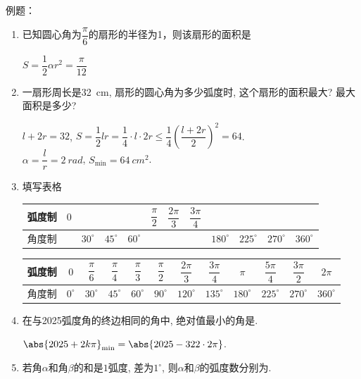 例题：
\begin{enumerate}
    \item 已知圆心角为$\dfrac{\pi}{6}$的扇形的半径为1，则该扇形的面积是
    \begin{jieda}
        $S = \dfrac{1}{2}\alpha r^2 = \dfrac{\pi}{12}$
    \end{jieda}
    \item 一扇形周长是\SI{32}{cm}, 扇形的圆心角为多少弧度时, 这个扇形的面积最大? 最大面积是多少? 
    \begin{jieda}
    $l+2r=32$, $S=\dfrac{1}{2}lr=\dfrac{1}{4}\cdot l\cdot2r\leq\dfrac{1}{4}\left(\dfrac{l+2r}{2}\right)^2=64$. \\
    $\alpha=\dfrac{l}{r}=\SI{2}{rad}$, $S_{\min}=\SI{64}{cm^2}$. 
    \end{jieda}
    \item 填写表格
    \begin{table}[h]
        \centering
        \tabcolsep=0.4cm
        \renewcommand\arraystretch{2}
        \begin{tabular}{c|c|c|c|c|c|c|c|c|c|c|c}
            \hline
            弧度制 & $0$ &  &  &  & $\dfrac{\pi}{2}$ & $\dfrac{2\pi}{3}$ & $\dfrac{3\pi}{4}$ &  &  &  &  \\
            \hline
            角度制 &  & $30^{\circ}$ & $45^{\circ}$ & $60^{\circ}$ &  &  &  & $180^{\circ}$ & $225^{\circ}$ & $270^{\circ}$ & $360^{\circ}$ \\
            \hline
        \end{tabular}
    \end{table}
    \begin{jieda}
        \begin{table}[h]
            \centering
            \tabcolsep=0.4cm
            \renewcommand\arraystretch{2}
            \begin{tabular}{c|c|c|c|c|c|c|c|c|c|c|c}
                \hline
                弧度制 & $0$ & $\dfrac{\pi}{6}$ & $\dfrac{\pi}{4}$ & $\dfrac{\pi}{3}$ & $\dfrac{\pi}{2}$ & $\dfrac{2\pi}{3}$ & $\dfrac{3\pi}{4}$ & $\pi$ & $\dfrac{5\pi}{4}$ & $\dfrac{3\pi}{2}$ & $2\pi$ \\
                \hline
                角度制 & $0^{\circ}$ & $30^{\circ}$ & $45^{\circ}$ & $60^{\circ}$ & $90^{\circ}$ & $120^{\circ}$ & $135^{\circ}$ & $180^{\circ}$ & $225^{\circ}$ & $270^{\circ}$ & $360^{\circ}$ \\
                \hline
            \end{tabular}
        \end{table}
    \end{jieda}
    \item 在与2025弧度角的终边相同的角中, 绝对值最小的角是. 
    \begin{jieda}
    $\abs{2025+2k\pi}_{\min}=\abs{2025-322\cdot2\pi}$. 
    \end{jieda}
    \item 若角$\alpha$和角$\beta$的和是$1$弧度, 差为$1^{\circ}$, 则$\alpha$和$\beta$的弧度数分别为. 
\end{enumerate}

